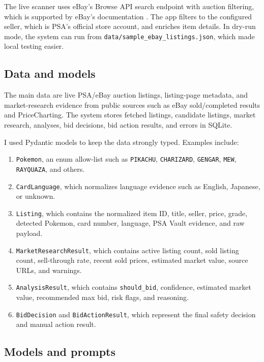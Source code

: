 \documentclass[10pt,twocolumn]{article}
\begin{document}
The live scanner uses eBay's Browse API search endpoint with auction filtering, which is supported by eBay's documentation \cite{ebaybrowse}. The app filters to the configured seller, which is PSA's official store account, and enriches item details. In dry-run mode, the system can run from \texttt{data/sample\_ebay\_listings.json}, which made local testing easier.

\subsection{Data and models}

The main data are live PSA/eBay auction listings, listing-page metadata, and market-research evidence from public sources such as eBay sold/completed results and PriceCharting. The system stores fetched listings, candidate listings, market research, analyses, bid decisions, bid action results, and errors in SQLite.

I used Pydantic models to keep the data strongly typed. Examples include:
\begin{enumerate}[leftmargin=*]
    \item \texttt{Pokemon}, an enum allow-list such as \texttt{PIKACHU}, \texttt{CHARIZARD}, \texttt{GENGAR}, \texttt{MEW}, \texttt{RAYQUAZA}, and others.
    \item \texttt{CardLanguage}, which normalizes language evidence such as English, Japanese, or unknown.
    \item \texttt{Listing}, which contains the normalized item ID, title, seller, price, grade, detected Pokemon, card number, language, PSA Vault evidence, and raw payload.
    \item \texttt{MarketResearchResult}, which contains active listing count, sold listing count, sell-through rate, recent sold prices, estimated market value, source URLs, and warnings.
    \item \texttt{AnalysisResult}, which contains \texttt{should\_bid}, confidence, estimated market value, recommended max bid, risk flags, and reasoning.
    \item \texttt{BidDecision} and \texttt{BidActionResult}, which represent the final safety decision and manual action result.
\end{enumerate}

\subsection{Models and prompts}
\end{document}
